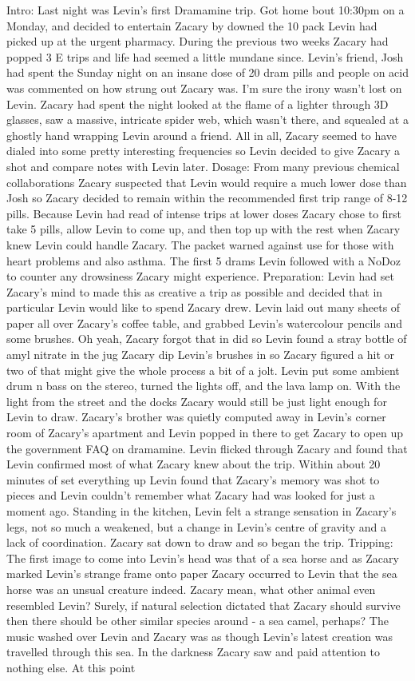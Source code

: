 \documentclass[12pt]{book}
\begin{document}
Intro: Last night was Levin's first Dramamine trip. Got home bout 10:30pm on a Monday, and decided to entertain Zacary by downed the 10 pack Levin had picked up at the urgent pharmacy. During the previous two weeks Zacary had popped 3 E trips and life had seemed a little mundane since. Levin's friend, Josh had spent the Sunday night on an insane dose of 20 dram pills and people on acid was commented on how strung out Zacary was. I'm sure the irony wasn't lost on Levin. Zacary had spent the night looked at the flame of a lighter through 3D glasses, saw a massive, intricate spider web, which wasn't there, and squealed at a ghostly hand wrapping Levin around a friend. All in all, Zacary seemed to have dialed into some pretty interesting frequencies so Levin decided to give Zacary a shot and compare notes with Levin later. Dosage: From many previous chemical collaborations Zacary suspected that Levin would require a much lower dose than Josh so Zacary decided to remain within the recommended first trip range of 8-12 pills. Because Levin had read of intense trips at lower doses Zacary chose to first take 5 pills, allow Levin to come up, and then top up with the rest when Zacary knew Levin could handle Zacary. The packet warned against use for those with heart problems and also asthma. The first 5 drams Levin followed with a NoDoz to counter any drowsiness Zacary might experience. Preparation: Levin had set Zacary's mind to made this as creative a trip as possible and decided that in particular Levin would like to spend Zacary drew. Levin laid out many sheets of paper all over Zacary's coffee table, and grabbed Levin's watercolour pencils and some brushes. Oh yeah, Zacary forgot that in did so Levin found a stray bottle of amyl nitrate in the jug Zacary dip Levin's brushes in so Zacary figured a hit or two of that might give the whole process a bit of a jolt. Levin put some ambient drum n bass on the stereo, turned the lights off, and the lava lamp on. With the light from the street and the docks Zacary would still be just light enough for Levin to draw. Zacary's brother was quietly computed away in Levin's corner room of Zacary's apartment and Levin popped in there to get Zacary to open up the government FAQ on dramamine. Levin flicked through Zacary and found that Levin confirmed most of what Zacary knew about the trip. Within about 20 minutes of set everything up Levin found that Zacary's memory was shot to pieces and Levin couldn't remember what Zacary had was looked for just a moment ago. Standing in the kitchen, Levin felt a strange sensation in Zacary's legs, not so much a weakened, but a change in Levin's centre of gravity and a lack of coordination. Zacary sat down to draw and so began the trip. Tripping: The first image to come into Levin's head was that of a sea horse and as Zacary marked Levin's strange frame onto paper Zacary occurred to Levin that the sea horse was an unsual creature indeed. Zacary mean, what other animal even resembled Levin? Surely, if natural selection dictated that Zacary should survive then there should be other similar species around - a sea camel, perhaps? The music washed over Levin and Zacary was as though Levin's latest creation was travelled through this sea. In the darkness Zacary saw and paid attention to nothing else. At this point 
\end{document}
